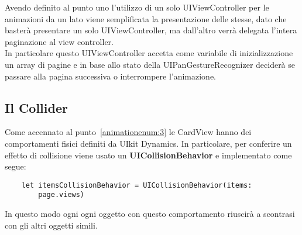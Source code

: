 Avendo definito al punto uno l'utilizzo di un solo UIViewController per le animazioni da un lato viene semplificata
la presentazione delle stesse, dato che basterà presentare un solo UIViewController, ma dall'altro verrà delegata
l'intera paginazione al view controller. \\

In particolare questo UIViewController accetta come variabile di inizializzazione
un array di pagine e in base allo stato della UIPanGestureRecognizer deciderà se passare alla pagina successiva
o interrompere l'animazione.

\subsection{Il Collider}

Come accennato al punto~\ref{animationenum:3} le CardView hanno dei comportamenti fisici definiti
da UIkit Dynamics. In particolare, per conferire un effetto di collisione viene usato un \textbf{UICollisionBehavior} e implementato come segue:

\begin{verbatim}
    let itemsCollisionBehavior = UICollisionBehavior(items:
        page.views)
\end{verbatim}

In questo modo ogni ogni oggetto con questo
comportamento riuscirà a scontrasi con gli altri oggetti simili.
